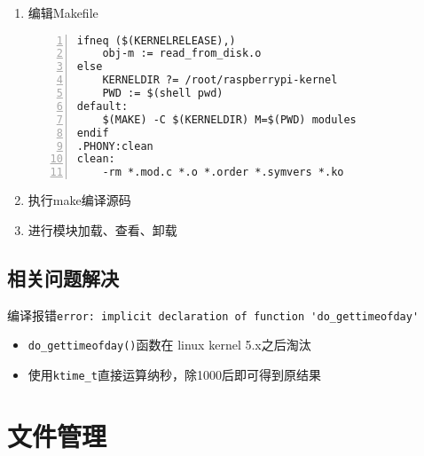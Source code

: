 \documentclass{article}
\begin{document}
\begin{enumerate}
\begin{lstlisting}[numbers=left]
#define buf_size 1024
#define read_times 524288

MODULE_LICENSE("GPL");

static int __init read_disk_init(void)
{
	struct file *fp_read;
	char buf[buf_size];
	int i;
	ktime_t startTime = 0;
	ktime_t endTime = 0;
	int read_time;
	loff_t pos;
	printk("Start read_from_disk module...\n");
	fp_read = filp_open("/home/tmp_file", O_RDONLY, 0);
	if (IS_ERR(fp_read)) {
		printk("Failed to open file...\n");
		return -1;
	}

    startTime = ktime_get_real();
	pos = 0;
	for(i = 0; i < read_times; i++)	{
		kernel_read(fp_read, buf, buf_size, &pos);
	}
	endTime = ktime_get_real();
	filp_close(fp_read, NULL);
	read_time = (endTime - startTime) / 1000;
	printk(KERN_ALERT "Read file costs %d us\n", read_time);	
	printk("Reading speed is %d M/s\n", buf_size * read_times / read_time);
	return 0;
}

static void __exit read_disk_exit(void)
{
	printk("Exit read_from_disk module...\n");
}

module_init(read_disk_init);
module_exit(read_disk_exit);

\end{lstlisting}
	\item 编辑Makefile
	      \begin{lstlisting}[numbers=left]
ifneq ($(KERNELRELEASE),)
	obj-m := read_from_disk.o
else
	KERNELDIR ?= /root/raspberrypi-kernel
	PWD := $(shell pwd)
default:
	$(MAKE) -C $(KERNELDIR) M=$(PWD) modules
endif
.PHONY:clean
clean:
	-rm *.mod.c *.o *.order *.symvers *.ko

\end{lstlisting}
	\item 执行make编译源码
	\item 进行模块加载、查看、卸载
\end{enumerate}

\subsection{相关问题解决}
编译报错\verb|error: implicit declaration of function 'do_gettimeofday'|
\begin{itemize}
	\item \verb|do_gettimeofday()|函数在 linux kernel 5.x之后淘汰
	\item 使用\verb|ktime_t|直接运算纳秒，除1000后即可得到原结果
\end{itemize}
\newpage
\section{文件管理}
\end{document}

